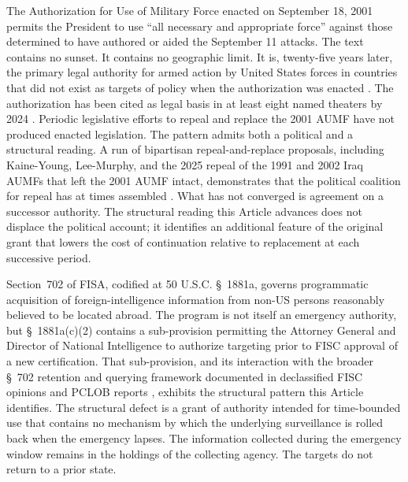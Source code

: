 The Authorization for Use of Military Force enacted on September 18, 2001 \cite{ref_aumf_2001}
permits the President to use ``all necessary and appropriate force'' against those determined to have
authored or aided the September 11 attacks.
The text contains no sunset.
It contains no geographic limit.
It is, twenty-five years later, the primary legal authority for armed action by United States forces
in countries that did not exist as targets of policy when the authorization was enacted
\cite{ref_brennan_center_aumf,ref_chesney_aumf}.
The authorization has been cited as legal basis in at least eight named theaters by 2024
\cite{ref_jaffer_aumf}.
Periodic legislative efforts to repeal and replace the 2001 AUMF have not produced enacted legislation.
The pattern admits both a political and a structural reading.
A run of bipartisan repeal-and-replace proposals,
including Kaine-Young, Lee-Murphy, and the 2025 repeal of the 1991 and 2002 Iraq AUMFs that left the 2001 AUMF intact,
demonstrates that the political coalition for repeal has at times assembled
\cite{ref_kaine_young_aumf,ref_iraq_aumf_repeal_2025}.
What has not converged is agreement on a successor authority.
The structural reading this Article advances does not displace the political account;
it identifies an additional feature of the original grant that lowers the cost of continuation
relative to replacement at each successive period.

Section~702 of FISA, codified at 50 U.S.C. \S~1881a, governs programmatic acquisition of foreign-intelligence information
from non-US persons reasonably believed to be located abroad.
The program is not itself an emergency authority,
but \S~1881a(c)(2) contains a sub-provision permitting the Attorney General and Director of National Intelligence
to authorize targeting prior to FISC approval of a new certification.
That sub-provision, and its interaction with the broader \S~702 retention and querying framework documented in
declassified FISC opinions and PCLOB reports
\cite{ref_pclob_702_report,ref_fisc_702_opinions},
exhibits the structural pattern this Article identifies.
The structural defect is a grant of authority intended for time-bounded use that contains no
mechanism by which the underlying surveillance is rolled back when the emergency lapses.
The information collected during the emergency window remains in the holdings of the collecting agency.
The targets do not return to a prior state.

